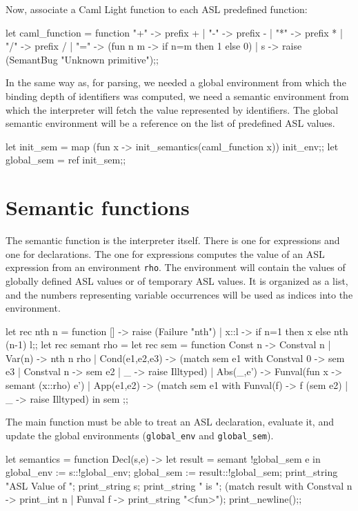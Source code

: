 Now, associate a Caml Light function to each ASL predefined function:
\begin{caml_example}
let caml_function = function
    "+" -> prefix +
  | "-" -> prefix -
  | "*" -> prefix *
  | "/" -> prefix /
  | "=" -> (fun n m -> if n=m then 1 else 0)
  | s -> raise (SemantBug "Unknown primitive");;
\end{caml_example}
In the same way as, for parsing, we needed a global environment from
which the binding depth of identifiers was computed, we need a
semantic environment from which the interpreter will fetch the value
represented by identifiers.
The global semantic environment will be a reference on the list of
predefined ASL values.
\begin{caml_example}
let init_sem =  map (fun x -> init_semantics(caml_function x))
                    init_env;;
let global_sem = ref init_sem;;
\end{caml_example}

\section{Semantic functions}

The semantic function is the interpreter itself. There is one for
expressions and one for declarations. The one for expressions
computes the value of an ASL
expression from an environment {\tt rho}. The environment will contain
the values of globally defined ASL values or of temporary ASL values.
It is organized as a list, and the numbers representing variable
occurrences will be used as indices into the environment.
%
\begin{caml_example}
let rec nth n = function
     []  -> raise (Failure "nth")
  | x::l -> if n=1 then x else nth (n-1) l;;
let rec semant rho =
  let rec sem = function
      Const n -> Constval n
    | Var(n) -> nth n rho
    | Cond(e1,e2,e3) ->
        (match sem e1 with Constval 0 -> sem e3
                         | Constval n -> sem e2
                         | _ -> raise Illtyped)
    | Abs(_,e') -> Funval(fun x -> semant (x::rho) e')
    | App(e1,e2) -> (match sem e1
                      with Funval(f) -> f (sem e2)
                         | _ -> raise Illtyped)
  in sem
;;
\end{caml_example}
%
The main function must be able to treat an ASL declaration, evaluate it, and
update the global environments (\verb"global_env" and \verb"global_sem").
\begin{caml_example}
let semantics = function Decl(s,e) ->
    let result = semant !global_sem e
    in global_env := s::!global_env;
       global_sem := result::!global_sem;
       print_string "ASL Value of ";
       print_string s;
       print_string " is ";
       (match result with
         Constval n -> print_int n
       | Funval f -> print_string "<fun>");
       print_newline();;
\end{caml_example}

